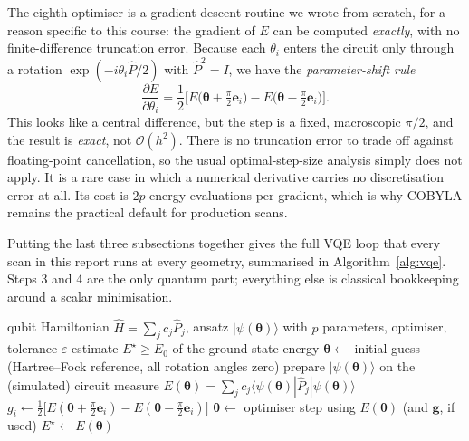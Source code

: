 \documentclass[sigconf,screen,nonacm]{acmart}
\begin{document}
The eighth optimiser is a gradient-descent routine we wrote from scratch, for
a reason specific to this course: the gradient of $E$ can be computed
\emph{exactly}, with no finite-difference truncation error. Because each
$\theta_i$ enters the circuit only through a rotation
$\exp(-i\theta_i \hat{P}/2)$ with $\hat{P}^2 = I$, we have the \emph{parameter-shift rule}~\cite{schuld2019}
\begin{equation}
\frac{\partial E}{\partial \theta_i}
= \frac{1}{2}\Big[
  E\big(\boldsymbol\theta + \tfrac{\pi}{2}\mathbf{e}_i\big)
- E\big(\boldsymbol\theta - \tfrac{\pi}{2}\mathbf{e}_i\big)\Big].
\label{eq:paramshift}
\end{equation}
This looks like a central difference, but the step is a fixed, macroscopic
$\pi/2$, and the result is \emph{exact}, not $\mathcal{O}(h^2)$. There is no
truncation error to trade off against floating-point cancellation, so the
usual optimal-step-size analysis simply does not apply. It is a rare case in
which a numerical derivative carries no discretisation error at all. Its
cost is $2p$ energy evaluations per gradient, which is why COBYLA remains the
practical default for production scans.

Putting the last three subsections together gives the full VQE loop that
every scan in this report runs at every geometry, summarised in
Algorithm~\ref{alg:vqe}. Steps 3 and 4 are the only quantum part; everything
else is classical bookkeeping around a scalar minimisation.

\begin{algorithm}[!ht]
\caption{Variational Quantum Eigensolver at one fixed geometry}
\label{alg:vqe}
\begin{algorithmic}[1]\small
\Require qubit Hamiltonian $\hat H=\sum_j c_j\hat P_j$, ansatz
  $|\psi(\boldsymbol\theta)\rangle$ with $p$ parameters, optimiser, tolerance
  $\varepsilon$
\Ensure estimate $E^\star \geq E_0$ of the ground-state energy
\State $\boldsymbol\theta \gets$ initial guess (Hartree--Fock reference, all
  rotation angles zero)
\Repeat
  \State prepare $|\psi(\boldsymbol\theta)\rangle$ on the (simulated) circuit
  \State measure $E(\boldsymbol\theta) = \sum_j c_j
    \langle\psi(\boldsymbol\theta)|\hat P_j|\psi(\boldsymbol\theta)\rangle$
      \State $g_i \gets \tfrac12\big[E(\boldsymbol\theta+\tfrac{\pi}{2}
        \mathbf e_i) - E(\boldsymbol\theta-\tfrac{\pi}{2}\mathbf e_i)\big]$
    \EndFor
  \EndIf
  \State $\boldsymbol\theta \gets$ optimiser step using $E(\boldsymbol\theta)$
    (and $\mathbf g$, if used)
\State \Return $E^\star \gets E(\boldsymbol\theta)$
\end{algorithmic}
\end{algorithm}
\end{document}
